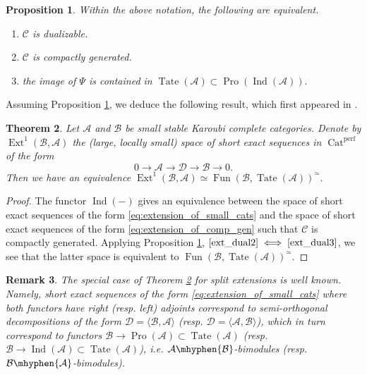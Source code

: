 \documentclass[11pt,leqno]{amsart}
\newcommand{\Iff}[2]{$\text{\ref{#1}}\iff\text{\ref{#2}}$}
\newtheorem{theo}{Theorem}[section]
\newtheorem{prop}[theo]{Proposition}
\newtheorem{remark}[theo]{Remark}
\numberwithin{equation}{section}
\newcommand{\Tate}{\operatorname{Tate}}
\newcommand{\Cat}{\operatorname{Cat}}
\newcommand{\cD}{{\mathcal D}}
\newcommand{\cA}{{\mathcal A}}
\newcommand{\cB}{{\mathcal B}}
\newcommand{\cC}{{\mathcal C}}
\newcommand{\Fun}{\operatorname{Fun}}
\newcommand{\perf}{\operatorname{perf}}
\newcommand{\Ext}{\operatorname{Ext}}
\newcommand{\Ind}{\operatorname{Ind}}
\newcommand{\Pro}{\operatorname{Pro}}
\begin{document}
\begin{prop}\label{prop:when_extension_is_dualizable} Within the above notation, the following are equivalent.

\begin{enumerate}[label=(\roman*),ref=(\roman*)]
\item $\cC$ is dualizable. \label{ext_dual1}

\item $\cC$ is compactly generated. \label{ext_dual2}

\item the image of $\Psi$ is contained in $\Tate(\cA)\subset\Pro(\Ind(\cA)).$ \label{ext_dual3}
\end{enumerate}
\end{prop}

Assuming Proposition \ref{prop:when_extension_is_dualizable}, we deduce the following result, which first appeared in \cite[Appendix A]{CDH+20}.

\begin{theo}\label{th:Ext^1_between_categories} Let $\cA$ and $\cB$ be small stable Karoubi complete categories. Denote by $\Ext^1(\cB,\cA)$ the (large, locally small) space of short exact sequences in $\Cat^{\perf}$ of the form
\begin{equation}\label{eq:extension_of_small_cats} 0\to\cA\to\cD\to\cB\to 0.\end{equation}
Then we have an equivalence $\Ext^1(\cB,\cA)\simeq \Fun(\cB,\Tate(\cA))^{\simeq}.$\end{theo}

\begin{proof}The functor $\Ind(-)$ gives an equivalence between the space of short exact sequences of the form \eqref{eq:extension_of_small_cats} and the space of short exact sequences of the form \eqref{eq:extension_of_comp_gen} such that $\cC$ is compactly generated. Applying Proposition \ref{prop:when_extension_is_dualizable}, \Iff{ext_dual2}{ext_dual3}, we see that the latter space is equivalent to $\Fun(\cB,\Tate(\cA))^{\simeq}.$\end{proof}

\begin{remark}The special case of Theorem \ref{th:Ext^1_between_categories} for split extensions is well known. Namely, short exact sequences of the form \eqref{eq:extension_of_small_cats} where both functors have right (resp. left) adjoints correspond to semi-orthogonal decompositions of the form $\cD=\langle\cB,\cA\rangle$ (resp. $\cD=\langle\cA,\cB\rangle$), which in turn correspond to functors $\cB\to\Pro(\cA)\subset\Tate(\cA)$ (resp. $\cB\to\Ind(\cA)\subset\Tate(\cA)$), i.e. $\cA\mhyphen\cB$-bimodules (resp. $\cB\mhyphen\cA$-bimodules).\end{remark}
\end{document}
